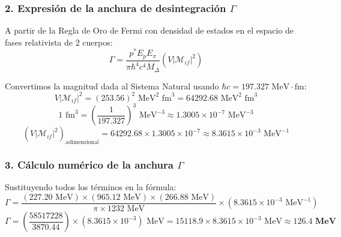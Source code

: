 \begin{problema}
\subsubsection*{2. Expresión de la anchura de desintegración $\Gamma$}

A partir de la Regla de Oro de Fermi con densidad de estados en el espacio de fases relativista de 2 cuerpos:
\begin{equation*}
\Gamma = \frac{p^* E_p E_\pi}{\pi \hbar^4 c^4 M_\Delta} \left( V |\mathcal{M}_{if}|^2 \right)
\end{equation*}

Convertimos la magnitud dada al Sistema Natural usando $\hbar c = 197.327\text{ MeV}\cdot\text{fm}$:
\begin{equation*}
V |\mathcal{M}_{if}|^2 = (253.56)^2\text{ MeV}^2\text{ fm}^3 = 64292.68\text{ MeV}^2\text{ fm}^3
\end{equation*}
\begin{equation*}
1\text{ fm}^3 = \left(\frac{1}{197.327}\right)^3\text{ MeV}^{-3} \approx 1.3005 \times 10^{-7}\text{ MeV}^{-3}
\end{equation*}
\begin{equation*}
\left( V |\mathcal{M}_{if}|^2 \right)_{\text{adimensional}} = 64292.68 \times 1.3005 \times 10^{-7} \approx 8.3615 \times 10^{-3}\text{ MeV}^{-1}
\end{equation*}

\subsubsection*{3. Cálculo numérico de la anchura $\Gamma$}

Sustituyendo todos los términos en la fórmula:
\begin{equation*}
\Gamma = \frac{(227.20\text{ MeV}) \times (965.12\text{ MeV}) \times (266.88\text{ MeV})}{\pi \times 1232\text{ MeV}} \times (8.3615 \times 10^{-3}\text{ MeV}^{-1})
\end{equation*}
\begin{equation*}
\Gamma = \left( \frac{58517228}{3870.44} \right) \times (8.3615 \times 10^{-3})\text{ MeV} = 15118.9 \times 8.3615 \times 10^{-3}\text{ MeV} \approx \mathbf{126.4\text{ MeV}}
\end{equation*}
\end{problema}

